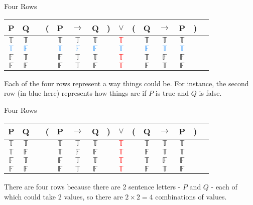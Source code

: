 \documentclass[
  ignorenonframetext,
]{beamer}
\renewcommand{\,}{\text{, }}
\def\True{\mathbb{T}}
\def\False{\mathbb{F}}
\begin{document}
\begin{frame}{Four Rows}
\protect\hypertarget{four-rows}{}
\begin{center}
\begin{tabular}{@{ }c@{ }@{ }c | c@{ }@{}c@{}@{ }c@{ }@{ }c@{ }@{ }c@{ }@{}c@{}@{ }c@{ }@{}c@{}@{ }c@{ }@{ }c@{ }@{ }c@{ }@{}c@{}@{ }c}
P & Q &  & ( & P & $\rightarrow$ & Q & ) & $\lor$ & ( & Q & $\rightarrow$ & P & ) & \\
\hline 
$\True$ & $\True$ &  &  & $\True$ & $\True$ & $\True$ &  & \textcolor{red}{$\True$} &  & $\True$ & $\True$ & $\True$ &  & \\
\textcolor{dodgerblue}{$\True$} & \textcolor{dodgerblue}{$\False$} &  &  & \textcolor{dodgerblue}{$\True$} & \textcolor{dodgerblue}{$\False$} & \textcolor{dodgerblue}{$\False$} &  & \textcolor{red}{\textcolor{dodgerblue}{$\True$}} &  & \textcolor{dodgerblue}{$\False$} & \textcolor{dodgerblue}{$\True$} & \textcolor{dodgerblue}{$\True$} &  & \\
$\False$ & $\True$ &  &  & $\False$ & $\True$ & $\True$ &  & \textcolor{red}{$\True$} &  & $\True$ & $\False$ & $\False$ &  & \\
$\False$ & $\False$ &  &  & $\False$ & $\True$ & $\False$ &  & \textcolor{red}{$\True$} &  & $\False$ & $\True$ & $\False$ &  & \\
\end{tabular}

\end{center}

Each of the four rows represent a way things could be. For instance, the
second row (in blue here) represents how things are if \(P\) is true and
\(Q\) is false.
\end{frame}

\begin{frame}{Four Rows}
\protect\hypertarget{four-rows-1}{}
\begin{center}
\begin{tabular}{@{ }c@{ }@{ }c | c@{ }@{}c@{}@{ }c@{ }@{ }c@{ }@{ }c@{ }@{}c@{}@{ }c@{ }@{}c@{}@{ }c@{ }@{ }c@{ }@{ }c@{ }@{}c@{}@{ }c}
P & Q &  & ( & P & $\rightarrow$ & Q & ) & $\lor$ & ( & Q & $\rightarrow$ & P & ) & \\
\hline 
$\True$ & $\True$ &  &  & $\True$ & $\True$ & $\True$ &  & \textcolor{red}{$\True$} &  & $\True$ & $\True$ & $\True$ &  & \\
$\True$ & $\False$ &  &  & $\True$ & $\False$ & $\False$ &  & \textcolor{red}{$\True$} &  & $\False$ & $\True$ & $\True$ &  & \\
$\False$ & $\True$ &  &  & $\False$ & $\True$ & $\True$ &  & \textcolor{red}{$\True$} &  & $\True$ & $\False$ & $\False$ &  & \\
$\False$ & $\False$ &  &  & $\False$ & $\True$ & $\False$ &  & \textcolor{red}{$\True$} &  & $\False$ & $\True$ & $\False$ &  & \\
\end{tabular}

\end{center}

There are four rows because there are 2 sentence letters - \(P\) and
\(Q\) - each of which could take 2 values, so there are
\(2 \times 2 = 4\) combinations of values.
\end{frame}
\end{document}
